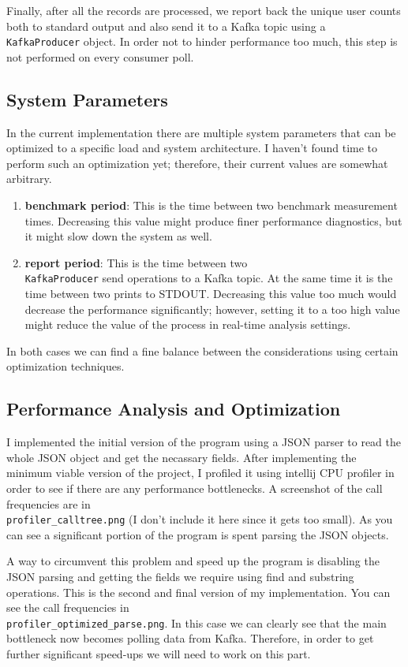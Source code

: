 \documentclass[letterpaper]{article}
\begin{document}
Finally, after all the records are processed, we report back the unique user counts both to standard output and also send it to a Kafka topic using a\\
\verb|KafkaProducer| object.
In order not to hinder performance too much, this step is not performed on every consumer poll.

\subsection{System Parameters}
In the current implementation there are multiple system parameters that can be optimized to a specific load and system architecture.
I haven't found time to perform such an optimization yet; therefore, their current values are somewhat arbitrary.
\begin{enumerate}
    \item \textbf{benchmark period}: This is the time between two benchmark measurement times. Decreasing this value might
        produce finer performance diagnostics, but it might slow down the system as well.
    \item \textbf{report period}: This is the time between two\\
        \verb|KafkaProducer| send operations to a Kafka topic. At the same time
        it is the time between two prints to STDOUT. Decreasing this value too much would decrease the performance significantly;
        however, setting it to a too high value might reduce the value of the process in real-time analysis settings.
\end{enumerate}
In both cases we can find a fine balance between the considerations using certain optimization techniques.

\subsection{Performance Analysis and Optimization}
I implemented the initial version of the program using a JSON parser to read the whole JSON object and get the necassary fields.
After implementing the minimum viable version of the project, I profiled it using intellij CPU profiler in order to see if
there are any performance bottlenecks. A screenshot of the call frequencies are in\\
\verb|profiler_calltree.png| (I don't include
it here since it gets too small). As you can see a significant portion of the program is spent parsing the
JSON objects.

A way to circumvent this problem and speed up the program is disabling the JSON parsing and getting the fields we require
using find and substring operations. This is the second and final version of my implementation. You can see the call frequencies
in\\
\verb|profiler_optimized_parse.png|. In this case we can clearly see that the main bottleneck now becomes polling data from
Kafka. Therefore, in order to get further significant speed-ups we will need to work on this part.
\end{document}

